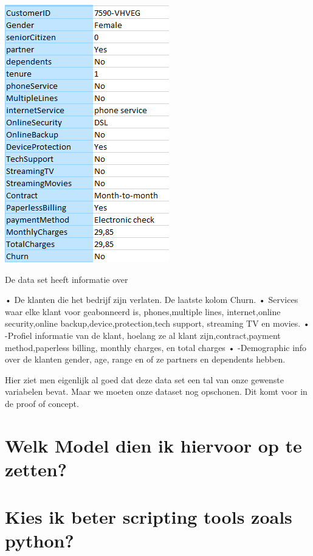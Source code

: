 \includegraphics[scale=0.8]{img/dataset}

De data set heeft informatie over

•	De klanten die het bedrijf zijn verlaten. De laatste kolom Churn. \newline
•	Services waar elke klant voor geabonneerd is, phones,multiple lines, internet,online security,online backup,device,protection,tech support, 		 streaming TV en movies. \newline
•	-Profiel informatie van de klant, hoelang ze al klant zijn,contract,payment method,paperless billing, monthly charges, en total charges\newline
•	-Demographic info over de klanten gender, age, range en of ze partners en dependents hebben.

Hier ziet men eigenlijk al goed dat deze data set een tal van onze gewenste variabelen bevat.
Maar we moeten onze dataset nog opschonen. Dit komt voor in de proof of concept.

\section{Welk Model dien ik hiervoor op te zetten?}

\section{Kies ik beter scripting tools zoals python?}











